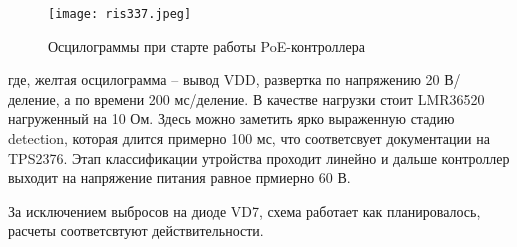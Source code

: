 \begin{figure}[H]
    \centering
    \texttt{[image: ris337.jpeg]}
    \caption{Осцилограммы при старте работы PoE-контроллера}
    \label{ris:337}
\end{figure}

где, желтая осцилограмма -- вывод VDD, развертка по напряжению 20 В/деление, а по времени 200 мс/деление. 
В качестве нагрузки стоит LMR36520 нагруженный на 10 Ом.
Здесь можно заметить ярко выраженную стадию detection, которая длится 
примерно 100 мс, что соответсвует документации на TPS2376. Этап классификации утройства проходит линейно и 
дальше контроллер выходит на напряжение питания равное прмиерно 60 В. 

За исключением выбросов на диоде VD7, схема работает как планировалось, расчеты соответсвтуют действительности.
